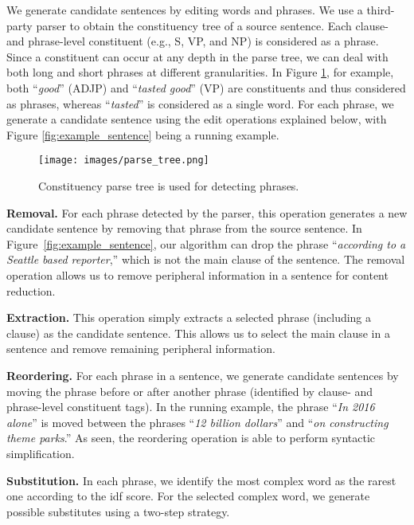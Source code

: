 \documentclass[11pt,a4paper]{article}
\begin{document}
We generate candidate sentences by editing words and phrases. We use a third-party parser to obtain the constituency tree of a source sentence. Each clause- and phrase-level constituent (e.g., S, VP, and NP) is considered as a phrase. 
Since a constituent can occur at any depth in the parse tree, we can deal with both long and short phrases at different granularities. In Figure \ref{fig:example_parsetree}, for example, both  ``\textit{good}'' (ADJP) and ``\textit{tasted good}'' (VP) are constituents and thus considered as phrases, whereas ``\textit{tasted}'' is considered as a single word. 
For each phrase, we generate a candidate sentence using the edit operations explained below, with Figure \ref{fig:example_sentence} being a running example.
\begin{figure}\centering
  \texttt{[image: images/parse\_tree.png]}\vspace{-.2cm}
  \caption{Constituency parse tree is used for detecting phrases.}\vspace{-.2cm}
  \label{fig:example_parsetree}
\end{figure}



\textbf{Removal.}
For each phrase detected by the parser, this operation generates a new candidate sentence by removing that phrase from the source sentence. In Figure~\ref{fig:example_sentence}, our algorithm can drop the phrase
``\textit{according to a Seattle based reporter},'' which is not the main clause of the sentence. The removal operation allows us to remove peripheral information in a sentence for content reduction. 

\textbf{Extraction.}
This operation simply extracts a selected phrase (including a clause) as the candidate sentence. This allows us to select the main clause in a sentence and remove remaining peripheral information.

\textbf{Reordering.}
For each phrase in a sentence, we generate candidate sentences by moving the phrase before or after another phrase (identified by clause- and phrase-level constituent tags).
In the running example, the phrase ``\textit{In 2016 alone}'' is moved between the phrases ``\textit{12 billion dollars}'' and ``\textit{on constructing theme parks}.''
As seen, the reordering operation is able to perform syntactic simplification.



\textbf{Substitution.}
In each phrase, we identify the most complex word as the rarest one according to the idf score. 
For the selected complex word, we generate possible substitutes using a two-step strategy. 
\end{document}
